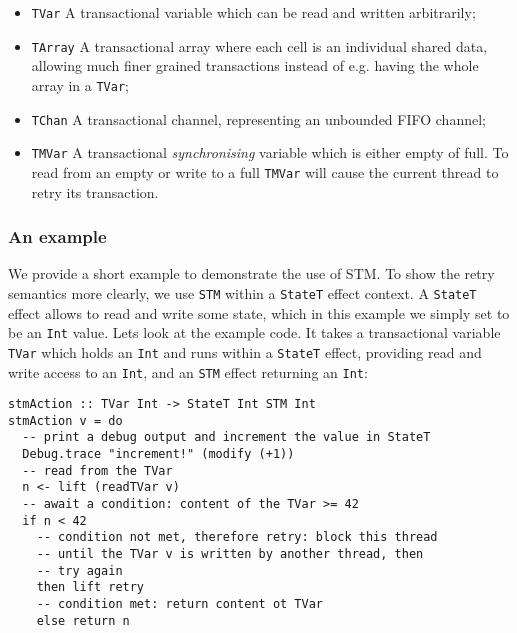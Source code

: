 \begin{itemize}
	\item \texttt{TVar}   A transactional variable which can be read and written arbitrarily;
	\item \texttt{TArray}   A transactional array where each cell is an individual shared data, allowing much finer grained transactions instead of e.g. having the whole array in a \texttt{TVar};
	\item \texttt{TChan}   A transactional channel, representing an unbounded FIFO channel;
	\item \texttt{TMVar}   A transactional \textit{synchronising} variable which is either empty of full. To read from an empty or write to a full \texttt{TMVar} will cause the current thread to retry its transaction.
\end{itemize}


\subsubsection{An example}
\label{sub:stm_example}
We provide a short example to demonstrate the use of STM. To show the retry semantics more clearly, we use \texttt{STM} within a \texttt{StateT} effect context. A \texttt{StateT} effect allows to read and write some state, which in this example we simply set to be an \texttt{Int} value. Lets look at the example code. It takes a transactional variable \texttt{TVar} which holds an \texttt{Int} and runs within a \texttt{StateT} effect, providing read and write access to an \texttt{Int}, and an \texttt{STM} effect returning an \texttt{Int}:

\begin{footnotesize}
\begin{verbatim}
stmAction :: TVar Int -> StateT Int STM Int 
stmAction v = do
  -- print a debug output and increment the value in StateT 
  Debug.trace "increment!" (modify (+1))
  -- read from the TVar
  n <- lift (readTVar v)
  -- await a condition: content of the TVar >= 42
  if n < 42
    -- condition not met, therefore retry: block this thread
    -- until the TVar v is written by another thread, then
    -- try again
    then lift retry
    -- condition met: return content ot TVar
    else return n
\end{verbatim}
\end{footnotesize}

